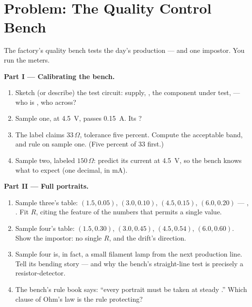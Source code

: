 \section{Problem: The Quality Control Bench}

\begin{problem}\label{pb:g8:ohms-law:1}
The factory's quality bench tests the day's production ---
and one impostor. You run the meters.

\medskip\noindent\textbf{Part I --- Calibrating the bench.}
\begin{enumerate}
  \item Sketch (or describe) the test circuit: supply,
        , the component under test,  --- who
        is , who across?
  \item Sample one, at \qty{4.5}{V}, passes \qty{0.15}{A}.
        Its ?
  \item The label claims $33\,\Omega$, tolerance five
        percent. Compute the acceptable band, and rule on
        sample one. (Five percent of $33$ first.)
  \item Sample two, labeled $150\,\Omega$: predict its current
        at \qty{4.5}{V}, so the bench knows what to expect
        (one decimal, in \unit{mA}).
\end{enumerate}

\medskip\noindent\textbf{Part II --- Full portraits.}
\begin{enumerate}[resume]
  \item Sample three's table: $(1.5, 0.05)$, $(3.0, 0.10)$,
        $(4.5, 0.15)$, $(6.0, 0.20)$ --- , . Fit
        $R$, citing the feature of the numbers that permits a
        single value.
  \item Sample four's table: $(1.5, 0.30)$, $(3.0, 0.45)$,
        $(4.5, 0.54)$, $(6.0, 0.60)$. Show the impostor: no
        single $R$, and the drift's direction.
  \item Sample four is, in fact, a small filament lamp from
        the next production line. Tell its bending story ---
        and why the bench's straight-line test is precisely a
        resistor-detector.
  \item The bench's rule book says: ``every portrait must be
        taken at steady .'' Which clause of Ohm's
        law is the rule protecting?
\end{enumerate}


\end{problem}
